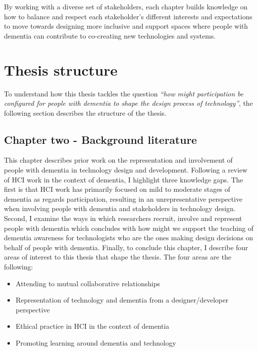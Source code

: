 By working with a diverse set of stakeholders, each chapter builds knowledge on how to balance and respect each stakeholder's different interests and expectations to move towards designing more inclusive and support spaces where people with dementia can contribute to co-creating new technologies and systems.

\section{Thesis structure}
\label{Intro: Thesis structure}
To understand how this thesis tackles the question \textit{``how might participation be configured for people with dementia to shape the design process of technology''}, the following section describes the structure of the thesis.

\subsection{Chapter two - Background literature}
\label{Intro:ChapterTwo}
This chapter describes prior work on the representation and involvement of people with dementia in technology design and development. Following a review of HCI work in the context of dementia, I highlight three knowledge gaps. The first is that HCI work has primarily focused on mild to moderate stages of dementia as regards participation, resulting in an unrepresentative perspective when involving people with dementia and stakeholders in technology design. Second, I examine the ways in which researchers recruit, involve and represent people with dementia which concludes with how might we support the teaching of dementia awareness for technologists who are the ones making design decisions on behalf of people with dementia. Finally, to conclude this chapter, I describe four areas of interest to this thesis that shape the thesis. The four areas are the following: 
\begin{itemize}
    \item Attending to mutual collaborative relationships
    \item Representation of technology and dementia from a designer/developer perspective
    \item Ethical practice in HCI in the context of dementia
    \item Promoting learning around dementia and technology
\end{itemize}


